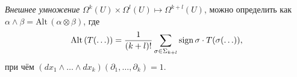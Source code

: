 \begin{to_def} 
    \textit{Внешнее умножение} $\Omega^k(U) \times \Omega^l (U) \mapsto \Omega^{k+l} (U)$, можно определить как $\alpha \wedge \beta = \text{Alt}\, (\alpha \otimes \beta)$, где
    \begin{equation*}
        \text{Alt}\, (T(\ldots)) = \frac{1}{(k+l)!} \sum_{\sigma \in \Sigma_{k+l}} \mathop{\mathrm{sign}}\nolimits \sigma \cdot T(\sigma(\ldots)),
    \end{equation*}
    при чём $(dx_1 \wedge \ldots \wedge dx_k)(\partial_1, \ldots, \partial_k) = 1$.
\end{to_def}

